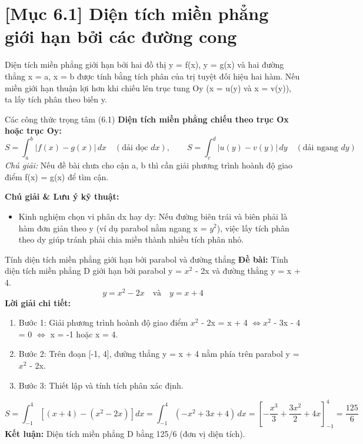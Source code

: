 \documentclass[11pt,a4paper,oneside]{book}
\begin{document}
\section{[Mục 6.1] Diện tích miền phẳng giới hạn bởi các đường cong}
Diện tích miền phẳng giới hạn bởi hai đồ thị y = f(x), y = g(x) và hai đường thẳng x = a, x = b được tính bằng tích phân của trị tuyệt đối hiệu hai hàm. Nếu miền giới hạn thuận lợi hơn khi chiếu lên trục tung Oy (x = u(y) và x = v(y)), ta lấy tích phân theo biến y.

\begin{congthuc}{Các công thức trọng tâm (6.1)}
\noindent\textbf{Diện tích miền phẳng chiếu theo trục Ox hoặc trục Oy:}
\[ S = \int_a^b |f(x) - g(x)|\,dx \quad (\text{dải dọc } dx), \qquad S = \int_c^d |u(y) - v(y)|\,dy \quad (\text{dải ngang } dy) \]
\noindent\textit{Chú giải:} Nếu đề bài chưa cho cận a, b thì cần giải phương trình hoành độ giao điểm f(x) = g(x) để tìm cận.\\[4pt]
\end{congthuc}

\noindent\textbf{Chú giải \& Lưu ý kỹ thuật:}
\begin{itemize}[leftmargin=1.5em, itemsep=2pt]
  \item Kinh nghiệm chọn vi phân dx hay dy: Nếu đường biên trái và biên phải là hàm đơn giản theo y (ví dụ parabol nằm ngang x = $y^2$), việc lấy tích phân theo dy giúp tránh phải chia miền thành nhiều tích phân nhỏ.
\end{itemize}

\begin{vidu}{Tính diện tích miền phẳng giới hạn bởi parabol và đường thẳng}
\textbf{Đề bài:} Tính diện tích miền phẳng D giới hạn bởi parabol y = $x^2$ - 2x và đường thẳng y = x + 4.
\[ y = x^2 - 2x \quad \text{và} \quad y = x + 4 \]
\textbf{Lời giải chi tiết:}
\begin{enumerate}[leftmargin=1.5em, itemsep=2pt]
  \item Bước 1: Giải phương trình hoành độ giao điểm $x^2$ - 2x = x + 4 $\iff x^2$ - 3x - 4 = 0 $\iff$  x = -1 hoặc x = 4.
  \item Bước 2: Trên đoạn [-1, 4], đường thẳng y = x + 4 nằm phía trên parabol y = $x^2$ - 2x.
  \item Bước 3: Thiết lập và tính tích phân xác định.
\end{enumerate}
\[ S = \int_{-1}^4 \left[(x + 4) - (x^2 - 2x)\right] dx = \int_{-1}^4 (-x^2 + 3x + 4)\,dx = \left[-\frac{x^3}{3} + \frac{3x^2}{2} + 4x\right]_{-1}^4 = \frac{125}{6} \]
\noindent\textbf{Kết luận:} Diện tích miền phẳng D bằng 125/6 (đơn vị diện tích).
\end{vidu}
\end{document}
